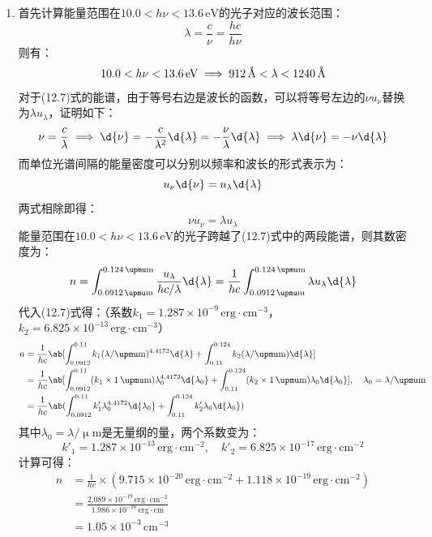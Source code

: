 \documentclass[a4paper,fontset=none]{ctexart}
\newcommand{\um}{\upmu\mathrm{m}}
\newcommand{\ang}{\text{\r{A}}}
\begin{document}
\begin{enumerate}
    \bigskip
    \item[12.2]
    首先计算能量范围在$10.0 < h\nu < 13.6\,\mathrm{eV}$的光子对应的波长范围：
    \[
        \lambda = \frac{c}{\nu} = \frac{hc}{h\nu}
    \]
    则有：
    \[
        10.0 < h\nu < 13.6\,\mathrm{eV} \implies 912\,\ang < \lambda < 1240\,\ang
    \]
    对于(12.7)式的能谱，由于等号右边是波长的函数，可以将等号左边的$\nu u_\nu$替换为$\lambda u_\lambda$，证明如下：
    \[
        \nu = \frac{c}{\lambda} \implies \d{\nu} = -\frac{c}{\lambda^2} \d{\lambda} = -\frac{\nu}{\lambda} \d{\lambda} \implies \lambda \d{\nu} = -\nu \d{\lambda}
    \]
    而单位光谱间隔的能量密度可以分别以频率和波长的形式表示为：
    \[
        u_\nu \d{\nu} = u_\lambda \d{\lambda}
    \]
    两式相除即得：
    \[
        \nu u_\nu = \lambda u_\lambda
    \]
    能量范围在$10.0 < h\nu < 13.6\,\mathrm{eV}$的光子跨越了(12.7)式中的两段能谱，则其数密度为：
    \[
        n = \int_{0.0912\,\um}^{0.124\,\um} \frac{u_\lambda}{hc/\lambda} \d{\lambda} = \frac{1}{hc} \int_{0.0912\,\um}^{0.124\,\um} \lambda u_\lambda \d{\lambda}
    \]
    代入(12.7)式得：（系数$k_1 = 1.287 \times 10^{-9}\,\mathrm{erg \cdot cm^{-3}}$，$k_2 = 6.825 \times 10^{-13}\,\mathrm{erg \cdot cm^{-3}}$）
    \begin{align*}
        n
        &= \frac{1}{hc} \ab[\int_{0.0912}^{0.11} k_1 (\lambda/\um)^{4.4172} \d{\lambda} + \int_{0.11}^{0.124} k_2 (\lambda/\um) \d{\lambda}] \\
        &= \frac{1}{hc} \ab[\int_{0.0912}^{0.11} (k_1 \times 1\,\um) \lambda_0^{4.4172} \d{\lambda_0} + \int_{0.11}^{0.124} (k_2 \times 1\,\um) \lambda_0 \d{\lambda_0}],\quad \lambda_0 = \lambda/\um \\
        &= \frac{1}{hc} \ab(\int_{0.0912}^{0.11} k'_1 \lambda_0^{4.4172} \d{\lambda_0} + \int_{0.11}^{0.124} k'_2 \lambda_0 \d{\lambda_0})
    \end{align*}
    其中$\lambda_0 = \lambda/\um$是无量纲的量，两个系数变为：
    \[
        k'_1 = 1.287 \times 10^{-13}\,\mathrm{erg \cdot cm^{-2}},\quad k'_2 = 6.825 \times 10^{-17}\,\mathrm{erg \cdot cm^{-2}}
    \]
    计算可得：
    \begin{align*}
        n
        &= \frac{1}{hc} \times (9.715 \times 10^{-20}\,\mathrm{erg \cdot cm^{-2}} + 1.118 \times 10^{-19}\,\mathrm{erg \cdot cm^{-2}}) \\
        &= \frac{2.089 \times 10^{-19}\,\mathrm{erg \cdot cm^{-2}}}{1.986 \times 10^{-16}\,\mathrm{erg \cdot cm}} \\
        &= 1.05 \times 10^{-3}\,\mathrm{cm^{-3}}
    \end{align*}

\end{enumerate}
\end{document}
